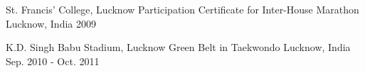 \begin{cventries}
  \cventry
    {St. Francis' College, Lucknow} %
    {Participation Certificate for Inter-House Marathon} %
    {Lucknow, India} %
    {2009} %
    {
      \begin{cvitems} %
      \end{cvitems}
    }

  \cventry
    {K.D. Singh Babu Stadium, Lucknow} %
    {Green Belt in Taekwondo} %
    {Lucknow, India} %
    {Sep. 2010 - Oct. 2011} %
    {
      \begin{cvitems} %
      \end{cvitems}
    }

\end{cventries}
